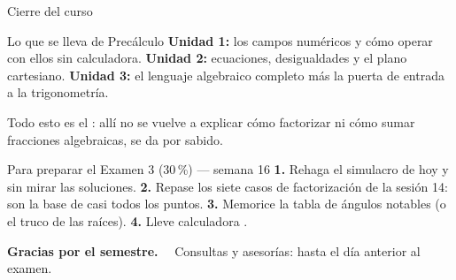\documentclass[aspectratio=169,10pt]{beamer}
\begin{document}
\begin{frame}{Cierre del curso}
  \scriptsize
  \begin{block}{Lo que se lleva de Precálculo}
    \tiny
    \textbf{Unidad 1:} los campos numéricos y cómo operar con ellos sin
    calculadora. \quad
    \textbf{Unidad 2:} ecuaciones, desigualdades y el plano cartesiano. \quad
    \textbf{Unidad 3:} el lenguaje algebraico completo más la puerta de entrada
    a la trigonometría.

    \vspace{0.08cm}
    Todo esto es el : allí no se
    vuelve a explicar cómo factorizar ni cómo sumar fracciones algebraicas, se
    da por sabido.
  \end{block}

  \vspace{0.1cm}
  \begin{alertblock}{Para preparar el Examen 3 (30\,\%) — semana 16}
    \tiny
    \textbf{1.} Rehaga el simulacro de hoy  y sin mirar las
    soluciones. \quad
    \textbf{2.} Repase los siete casos de factorización de la sesión 14: son la
    base de casi todos los puntos. \quad
    \textbf{3.} Memorice la tabla de ángulos notables (o el truco de las
    raíces). \quad
    \textbf{4.} Lleve calculadora .
  \end{alertblock}

  \vspace{0.1cm}
  \begin{center}
    {\footnotesize\color{uniAzul}\textbf{Gracias por el semestre.}
    \ \ Consultas y asesorías: hasta el día anterior al examen.}
  \end{center}
\end{frame}
\end{document}
